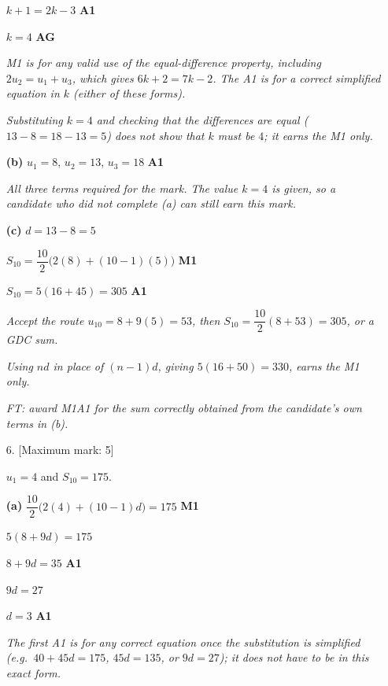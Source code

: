 \documentclass[12pt, twoside]{article}
\begin{document}
\begin{enumerate}[itemsep=0.3cm]
$k + 1 = 2k - 3$ \hfill \textbf{A1}

$k = 4$ \hfill \textbf{AG}

\emph{M1 is for any valid use of the equal-difference property, including
$2u_{2} = u_{1} + u_{3}$, which gives $6k + 2 = 7k - 2$. The A1 is for a
correct simplified equation in $k$ (either of these forms).}

\emph{Substituting $k = 4$ and checking that the differences are equal
($13 - 8 = 18 - 13 = 5$) does not show that $k$ must be $4$; it earns the
M1 only.}

\medskip

\textbf{(b)} $u_{1} = 8$, \quad $u_{2} = 13$, \quad $u_{3} = 18$
\hfill \textbf{A1}

\emph{All three terms required for the mark. The value $k = 4$ is given,
so a candidate who did not complete (a) can still earn this mark.}

\medskip

\textbf{(c)} $d = 13 - 8 = 5$

$S_{10} = \dfrac{10}{2}\bigl(2(8) + (10 - 1)(5)\bigr)$ \hfill \textbf{M1}

$S_{10} = 5(16 + 45) = 305$ \hfill \textbf{A1}

\emph{Accept the route $u_{10} = 8 + 9(5) = 53$, then
$S_{10} = \dfrac{10}{2}(8 + 53) = 305$, or a GDC sum.}

\emph{Using $nd$ in place of $(n - 1)d$, giving $5(16 + 50) = 330$, earns
the M1 only.}

\emph{FT: award M1A1 for the sum correctly obtained from the candidate's
own terms in (b).}

\newpage

\item[6.] [Maximum mark: 5]

$u_{1} = 4$ and $S_{10} = 175$.

\medskip

\textbf{(a)} $\dfrac{10}{2}\bigl(2(4) + (10 - 1)d\bigr) = 175$
\hfill \textbf{M1}

$5(8 + 9d) = 175$

$8 + 9d = 35$ \hfill \textbf{A1}

$9d = 27$

$d = 3$ \hfill \textbf{A1}

\emph{The first A1 is for any correct equation once the substitution is
simplified (e.g.\ $40 + 45d = 175$, $45d = 135$, or $9d = 27$); it does
not have to be in this exact form.}


\end{enumerate}
\end{document}

